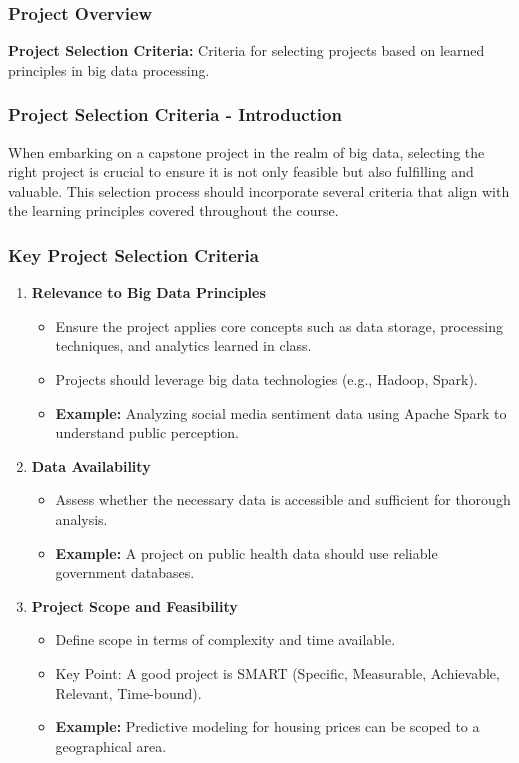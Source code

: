\documentclass[aspectratio=169]{beamer}
\begin{document}
\begin{frame}[fragile]
    \frametitle{Project Overview}
    \textbf{Project Selection Criteria:} Criteria for selecting projects based on learned principles in big data processing.
\end{frame}

\begin{frame}[fragile]
    \frametitle{Project Selection Criteria - Introduction}
    When embarking on a capstone project in the realm of big data, selecting the right project is crucial to ensure it is not only feasible but also fulfilling and valuable. This selection process should incorporate several criteria that align with the learning principles covered throughout the course.
\end{frame}

\begin{frame}[fragile]
    \frametitle{Key Project Selection Criteria}
    \begin{enumerate}
        \item \textbf{Relevance to Big Data Principles}
        \begin{itemize}
            \item Ensure the project applies core concepts such as data storage, processing techniques, and analytics learned in class.
            \item Projects should leverage big data technologies (e.g., Hadoop, Spark).
            \item \textbf{Example:} Analyzing social media sentiment data using Apache Spark to understand public perception.
        \end{itemize}
        
        \item \textbf{Data Availability}
        \begin{itemize}
            \item Assess whether the necessary data is accessible and sufficient for thorough analysis.
            \item \textbf{Example:} A project on public health data should use reliable government databases.
        \end{itemize}
        
        \item \textbf{Project Scope and Feasibility}
        \begin{itemize}
            \item Define scope in terms of complexity and time available.
            \item Key Point: A good project is SMART (Specific, Measurable, Achievable, Relevant, Time-bound).
            \item \textbf{Example:} Predictive modeling for housing prices can be scoped to a geographical area.
        \end{itemize}
    \end{enumerate}
\end{frame}
\end{document}
